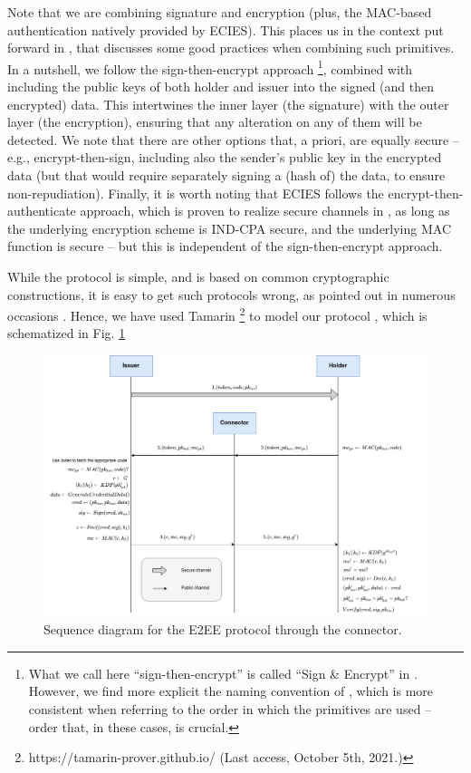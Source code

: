 \documentclass[10pt,a4paper]{article}
\newcommand{\figref}[1]{Fig. \ref{#1}}
\newcommand{\todo}[1]{{\colorbox{red}{\bf TODO:}\textcolor{red}{#1}}}
\begin{document}
Note that we are combining signature and encryption (plus, the MAC-based
authentication natively provided by ECIES). This places us in the context put
forward in \cite{davi01}, that discusses some good practices when combining such
primitives. In a nutshell, we follow the sign-then-encrypt approach%
\footnote{What we call here ``sign-then-encrypt'' is called ``Sign \& Encrypt''
  in \cite{davi01}. However, we find
  more explicit the naming convention of \cite{kraw01}, which is more consistent
  when referring to the order in which the primitives are used -- order that, in
  these cases, is crucial.}, combined with including the public
keys of both holder and issuer into the signed (and then encrypted) data.
This intertwines the inner layer (the signature) with the outer layer (the
encryption), ensuring that any alteration on any of them will be detected.
We note that there are other options that, a priori, are equally secure -- e.g.,
encrypt-then-sign, including also the sender's public key in the encrypted data
(but that would require separately signing a (hash of) the data, to ensure
non-repudiation). Finally, it is worth noting that ECIES follows the
encrypt-then-authenticate approach, which is proven to realize secure channels
in \cite{kraw01}, as long as the underlying encryption scheme is IND-CPA secure,
and the underlying MAC function is secure -- but this is independent of the
sign-then-encrypt approach.

While the protocol is simple, and is based on common cryptographic constructions,
it is easy to get such protocols wrong, as pointed out in numerous occasions
\cite{davi01, kraw01}. Hence, we have used Tamarin%
\footnote{https://tamarin-prover.github.io/ (Last access, October 5th, 2021.)}
to model our protocol%
, which is schematized in \figref{fig:e2econnector}

\begin{figure}[ht!]
  \centering
  \includegraphics[scale=0.4]{figures/connector.png}
  \caption{Sequence diagram for the E2EE protocol through the connector.}
  \label{fig:e2econnector}%
\end{figure}
\end{document}
